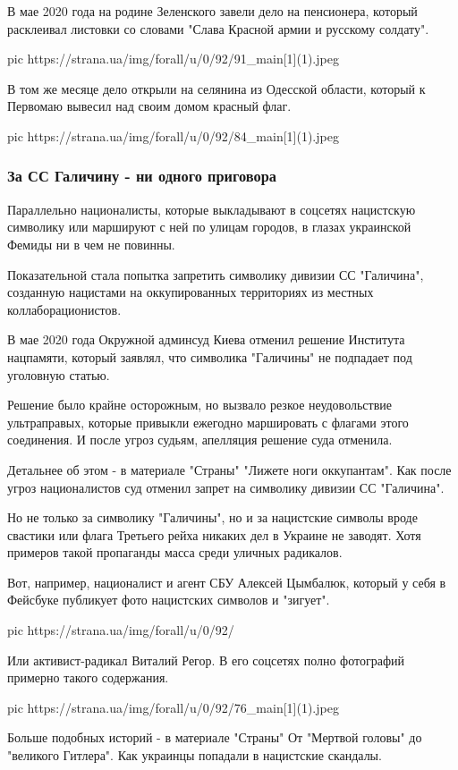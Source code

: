 В мае 2020 года на родине Зеленского завели дело на пенсионера, который
расклеивал листовки со словами "Слава Красной армии и русскому солдату". 


\ifcmt
  pic https://strana.ua/img/forall/u/0/92/91_main[1](1).jpeg
\fi

В том же месяце дело открыли на селянина из Одесской области, который к
Первомаю вывесил над своим домом красный флаг.

\ifcmt
  pic https://strana.ua/img/forall/u/0/92/84_main[1](1).jpeg
\fi

\subsubsection{За СС Галичину - ни одного приговора}

Параллельно националисты, которые выкладывают в соцсетях нацистскую символику
или маршируют с ней по улицам городов, в глазах украинской Фемиды ни в чем не
повинны. 

Показательной стала попытка запретить символику дивизии СС "Галичина",
созданную нацистами на оккупированных территориях из местных
коллаборационистов. 

В мае 2020 года  Окружной админсуд Киева отменил решение Института нацпамяти,
который заявлял, что символика "Галичины" не подпадает под уголовную статью. 

Решение было крайне осторожным, но вызвало резкое неудовольствие ультраправых,
которые привыкли ежегодно маршировать с флагами этого соединения. И после угроз
судьям, апелляция решение суда отменила. 

Детальнее об этом - в материале "Страны" "Лижете ноги оккупантам". Как после
угроз националистов суд отменил запрет на символику дивизии СС "Галичина".

Но не только за символику "Галичины", но и за нацистские символы вроде свастики
или флага Третьего рейха никаких дел в Украине не заводят. Хотя примеров такой
пропаганды масса среди уличных радикалов.

Вот, например, националист и агент СБУ Алексей Цымбалюк, который у себя в
Фейсбуке публикует фото нацистских символов и "зигует". 

\ifcmt
  pic https://strana.ua/img/forall/u/0/92/%
\fi

Или активист-радикал Виталий Регор. В его соцсетях полно фотографий примерно
такого содержания.

\ifcmt
  pic https://strana.ua/img/forall/u/0/92/76_main[1](1).jpeg
\fi

Больше подобных историй - в материале "Страны" От "Мертвой головы" до "великого
Гитлера". Как украинцы попадали в нацистские скандалы.

